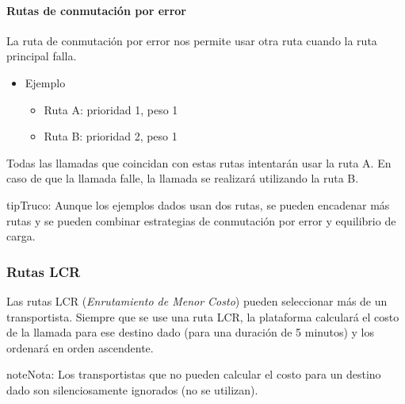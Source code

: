 \documentclass[letterpaper,10pt,spanish]{sphinxmanual}
\begin{document}
\paragraph{Rutas de conmutación por error}
\label{administration_portal/brand/routing/outgoing_routings:failover-routes}
La ruta de conmutación por error nos permite usar otra ruta cuando la ruta principal falla.
\begin{itemize}
\item {} 
Ejemplo
\begin{itemize}
\item {} 
Ruta A: prioridad 1, peso 1

\item {} 
Ruta B: prioridad 2, peso 1

\end{itemize}

\end{itemize}

Todas las llamadas que coincidan con estas rutas intentarán usar la ruta A. En caso de que la llamada falle, la llamada se realizará utilizando la ruta B.

\begin{notice}{tip}{Truco:}
Aunque los ejemplos dados usan dos rutas, se pueden encadenar más rutas y se pueden combinar estrategias de conmutación por error y equilibrio de carga.
\end{notice}


\subsubsection{Rutas LCR}
\label{administration_portal/brand/routing/outgoing_routings:lcr-routes}
Las rutas LCR (\emph{Enrutamiento de Menor Costo}) pueden seleccionar más de un transportista. Siempre que se use una ruta LCR, la plataforma calculará el costo de la llamada para ese destino dado (para una duración de 5 minutos) y los ordenará en orden ascendente.

\begin{notice}{note}{Nota:}
Los transportistas que no pueden calcular el costo para un destino dado son silenciosamente ignorados (no se utilizan).
\end{notice}
\end{document}
